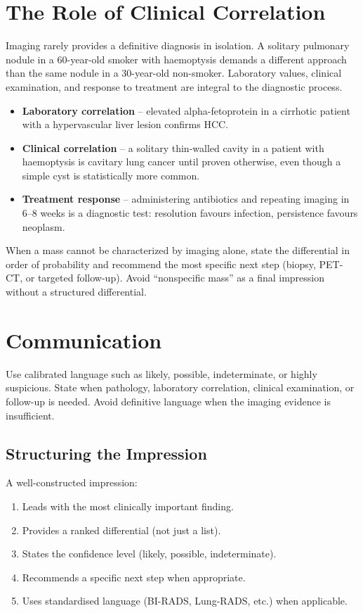 \section{The Role of Clinical Correlation}
Imaging rarely provides a definitive diagnosis in isolation. A solitary pulmonary nodule in a 60-year-old smoker with haemoptysis demands a different approach than the same nodule in a 30-year-old non-smoker. Laboratory values, clinical examination, and response to treatment are integral to the diagnostic process.

\begin{itemize}
    \item \textbf{Laboratory correlation} -- elevated alpha-fetoprotein in a cirrhotic patient with a hypervascular liver lesion confirms HCC.
    \item \textbf{Clinical correlation} -- a solitary thin-walled cavity in a patient with haemoptysis is cavitary lung cancer until proven otherwise, even though a simple cyst is statistically more common.
    \item \textbf{Treatment response} -- administering antibiotics and repeating imaging in 6--8 weeks is a diagnostic test: resolution favours infection, persistence favours neoplasm.
\end{itemize}

\begin{pearlbox}
When a mass cannot be characterized by imaging alone, state the differential in order of probability and recommend the most specific next step (biopsy, PET-CT, or targeted follow-up). Avoid ``nonspecific mass'' as a final impression without a structured differential.
\end{pearlbox}

\section{Communication}
Use calibrated language such as likely, possible, indeterminate, or highly suspicious. State when pathology, laboratory correlation, clinical examination, or follow-up is needed. Avoid definitive language when the imaging evidence is insufficient.

\subsection{Structuring the Impression}
A well-constructed impression:
\begin{enumerate}
    \item Leads with the most clinically important finding.
    \item Provides a ranked differential (not just a list).
    \item States the confidence level (likely, possible, indeterminate).
    \item Recommends a specific next step when appropriate.
    \item Uses standardised language (BI-RADS, Lung-RADS, etc.) when applicable.
\end{enumerate}

